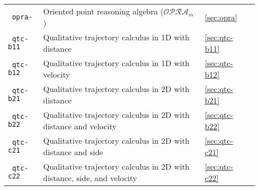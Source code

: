 \documentclass[headsepline]{scrreprt}
\theoremstyle{definition}
\newcommand{\opra}{$\mathcal{OPRA}_m$}
\begin{document}
\begin{center}
\begin{longtable}{|p{4cm}p{6cm}ll|}
	\texttt{ opra-} & Oriented point reasoning algebra (\opra{})\citep{moratz06_opra} & \ref{sec:opra} & \pageref{sec:opra}\\
	\texttt{ qtc-b11} & Qualitative trajectory calculus in 1D with distance \citep{Weghe04_PhD} & \ref{sec:qtc-b11} & \pageref{sec:qtc-b11}\\
	\texttt{ qtc-b12} & Qualitative trajectory calculus in 1D with velocity \citep{Weghe04_PhD} & \ref{sec:qtc-b12} & \pageref{sec:qtc-b12}\\
	\texttt{ qtc-b21} & Qualitative trajectory calculus in 2D with distance \citep{Weghe04_PhD} & \ref{sec:qtc-b21} & \pageref{sec:qtc-b21}\\
	\texttt{ qtc-b22} & Qualitative trajectory calculus in 2D with distance and velocity \citep{Weghe04_PhD} & \ref{sec:qtc-b22} & \pageref{sec:qtc-b22}\\
	\texttt{ qtc-c21} & Qualitative trajectory calculus in 2D with distance and side \citep{Weghe04_PhD} & \ref{sec:qtc-c21} & \pageref{sec:qtc-c21}\\
	\texttt{ qtc-c22} & Qualitative trajectory calculus in 2D with distance, side, and velocity \citep{Weghe04_PhD} & \ref{sec:qtc-c22} & \pageref{sec:qtc-c22}\\
	\hline
\end{longtable}
\end{center}
\renewcommand{\arraystretch}{1.0}
\end{document}
